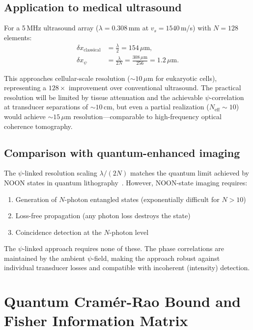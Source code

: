 \documentclass[aps,prl,twocolumn,superscriptaddress,showpacs]{revtex4-2}
\theoremstyle{definition}
\begin{document}
\subsection{Application to medical ultrasound}

For a 5\,MHz ultrasound array ($\lambda = 0.308$\,mm at $v_s = 1540$\,m/s)
with $N = 128$ elements:
\begin{align}
\delta x_{\mathrm{classical}} &= \frac{\lambda}{2} = 154\,\mu\mathrm{m},
\label{eq:classical-us}\\
\delta x_\psi &= \frac{\lambda}{2N} = \frac{308\,\mu\mathrm{m}}{256}
= 1.2\,\mu\mathrm{m}.
\label{eq:psi-us}
\end{align}

This approaches cellular-scale resolution ($\sim 10\,\mu$m for
eukaryotic cells), representing a $128\times$ improvement over
conventional ultrasound. The practical resolution will be limited
by tissue attenuation and the achievable $\psi$-correlation at
transducer separations of $\sim 10$\,cm, but even a partial
realization ($N_{\mathrm{eff}} \sim 10$) would achieve
$\sim 15\,\mu\mathrm{m}$ resolution---comparable to high-frequency
optical coherence tomography.

\subsection{Comparison with quantum-enhanced imaging}

The $\psi$-linked resolution scaling $\lambda/(2N)$ matches the
quantum limit achieved by NOON states in quantum
lithography~\cite{Boto2000}. However, NOON-state imaging requires:
\begin{enumerate}
\item Generation of $N$-photon entangled states (exponentially
difficult for $N > 10$)
\item Loss-free propagation (any photon loss destroys the state)
\item Coincidence detection at the $N$-photon level
\end{enumerate}

The $\psi$-linked approach requires none of these. The phase
correlations are maintained by the ambient $\psi$-field, making
the approach robust against individual transducer losses and
compatible with incoherent (intensity) detection.

\section{Quantum Cram\'er-Rao Bound and Fisher Information Matrix}
\label{sec:qcrb}
\end{document}
